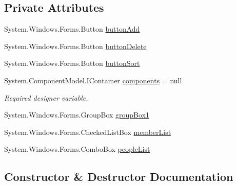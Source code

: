 \subsection*{Private Attributes}
\begin{DoxyCompactItemize}
\item 
System.\+Windows.\+Forms.\+Button \hyperlink{class__7___doroshenko__forms2__is52_1_1_test_list_a37b4b6e275fe7ca348d05ee54639e0e9}{button\+Add}
\item 
System.\+Windows.\+Forms.\+Button \hyperlink{class__7___doroshenko__forms2__is52_1_1_test_list_a91d50fe685bec5ec28d184180d91c947}{button\+Delete}
\item 
System.\+Windows.\+Forms.\+Button \hyperlink{class__7___doroshenko__forms2__is52_1_1_test_list_afc95b7f6d4e7be5cd8ebd2d349f0eb6f}{button\+Sort}
\item 
System.\+Component\+Model.\+I\+Container \hyperlink{class__7___doroshenko__forms2__is52_1_1_test_list_aecd79a1000919e1e6ac27e02e0b57400}{components} = null
\begin{DoxyCompactList}\small\item\em Required designer variable. \end{DoxyCompactList}\item 
System.\+Windows.\+Forms.\+Group\+Box \hyperlink{class__7___doroshenko__forms2__is52_1_1_test_list_aeeecfa4dc8c9c35fc0fd627d191804c1}{group\+Box1}
\item 
System.\+Windows.\+Forms.\+Checked\+List\+Box \hyperlink{class__7___doroshenko__forms2__is52_1_1_test_list_a6ae8b83f659e1c9aa5870f96aa553f0e}{member\+List}
\item 
System.\+Windows.\+Forms.\+Combo\+Box \hyperlink{class__7___doroshenko__forms2__is52_1_1_test_list_a79206bb1b99520d725562d5b3aef35cb}{people\+List}
\end{DoxyCompactItemize}


\subsection{Constructor \& Destructor Documentation}
\hypertarget{class__7___doroshenko__forms2__is52_1_1_test_list_a5190182621fe4b4acb79b2dfabf0a236}{}\label{class__7___doroshenko__forms2__is52_1_1_test_list_a5190182621fe4b4acb79b2dfabf0a236} 
